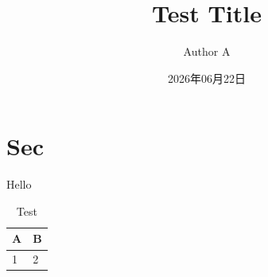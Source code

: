 \documentclass[twocolumn,dark,nomath]{harryopo-paper}
\title{Test Title}
\author{Author A}
\date{2026年06月22日}
\begin{document}
%
\section{Sec}
Hello
\begin{table}[htbp]
  \centering
  \caption{Test}
  \begin{tabular}{ll}
    \toprule A & B \\ \midrule 1 & 2 \\ \bottomrule
  \end{tabular}
\end{table}
\end{document}
